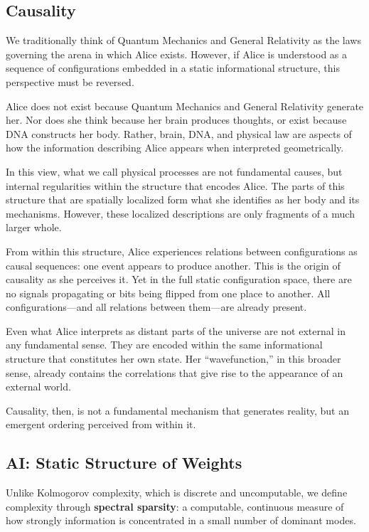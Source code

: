 \subsection*{Causality}

We traditionally think of Quantum Mechanics and General Relativity as the laws governing the arena in which Alice exists.
However, if Alice is understood as a sequence of configurations embedded in a static informational structure, this perspective must be reversed.

Alice does not exist because Quantum Mechanics and General Relativity generate her. Nor does she think because her brain produces thoughts, or exist because DNA constructs her body. Rather, brain, DNA, and physical law are aspects of how the information describing Alice appears when interpreted geometrically.

In this view, what we call physical processes are not fundamental causes, but internal regularities within the structure that encodes Alice. The parts of this structure that are spatially localized form what she identifies as her body and its mechanisms. However, these localized descriptions are only fragments of a much larger whole.

From within this structure, Alice experiences relations between configurations as causal sequences: one event appears to produce another. This is the origin of causality as she perceives it. Yet in the full static configuration space, there are no signals propagating or bits being flipped from one place to another. All configurations—and all relations between them—are already present.

Even what Alice interprets as distant parts of the universe are not external in any fundamental sense. They are encoded within the same informational structure that constitutes her own state. Her “wavefunction,” in this broader sense, already contains the correlations that give rise to the appearance of an external world.

Causality, then, is not a fundamental mechanism that generates reality, but an emergent ordering perceived from within it.


\subsection*{AI: Static Structure of Weights}

Unlike Kolmogorov complexity, which is discrete and uncomputable, we define complexity through \textbf{spectral sparsity}: a computable, continuous measure of how strongly information is concentrated in a small number of dominant modes.

